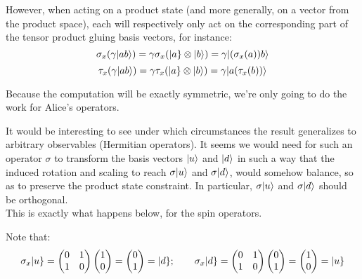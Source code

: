 \documentclass[solutions.tex]{subfiles}
\begin{document}
However, when acting on a product state (and more generally, on
a vector from the product space), each will respectively only
act on the corresponding part of the tensor product gluing
basis vectors, for instance:
\[
	\sigma_x(\gamma|ab\rangle)
		= \gamma\sigma_x(|a\}\otimes|b\rangle)
		= \gamma|(\sigma_x(a))b\rangle
\]
\[
	\tau_x(\gamma|ab\rangle)
		= \gamma\tau_x(|a\}\otimes|b\rangle)
		= \gamma|a(\tau_x(b))\rangle
\]

Because the computation will be exactly symmetric, we're only going to
do the work for Alice's operators.
\begin{remark} It would be interesting to see under which circumstances
the result generalizes to arbitrary observables (Hermitian operators). It
seems we would need for such an operator $\sigma$ to transform the basis
vectors $|u\rangle$ and $|d\rangle$ in such a way that the induced
rotation and scaling to reach $\sigma|u\rangle$ and $\sigma|d\rangle$,
would somehow balance, so as to preserve the product state constraint.
In particular, $\sigma|u\rangle$ and $\sigma|d\rangle$ should be orthogonal. \\

This is exactly what happens below, for the spin operators.
\end{remark}

\hrr

Note that:
\[
	\sigma_x|u\} = \begin{pmatrix}
		0 & 1 \\
		1 & 0 \\
	\end{pmatrix}\begin{pmatrix} 1 \\ 0 \\ \end{pmatrix} = \begin{pmatrix}
		0 \\ 1 \\
	\end{pmatrix} = |d\};\qquad\sigma_x|d\} = \begin{pmatrix}
		0 & 1 \\
		1 & 0 \\
	\end{pmatrix}\begin{pmatrix} 0 \\ 1 \\ \end{pmatrix} = \begin{pmatrix}
		1 \\ 0 \\
	\end{pmatrix} = |u\}
\]
\end{document}

